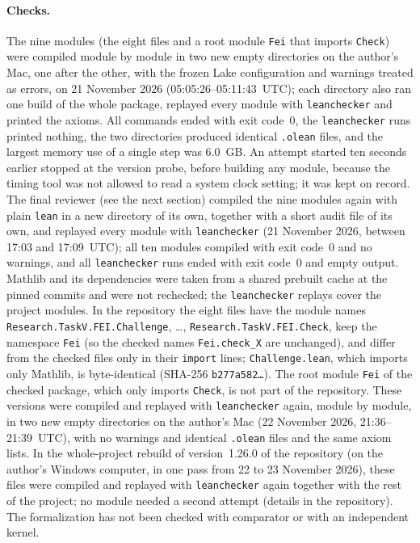 \documentclass[11pt]{article}
\theoremstyle{definition}
\theoremstyle{remark}
\newcommand{\repoversion}{1.26.0}
\begin{document}
{\paragraph{Checks.} The nine modules (the eight files and a root module
\texttt{Fei} that imports \texttt{Check}) were compiled module by module in two
new empty directories on the author's Mac, one after the other, with the frozen
Lake configuration and warnings treated as errors, on 21 November 2026
(05:05:26--05:11:43~UTC); each directory also ran one build of the whole
package, replayed every module with \texttt{leanchecker} and printed the axioms.
All commands ended with exit code~$0$, the \texttt{leanchecker} runs printed
nothing, the two directories produced identical \texttt{.olean} files, and the
largest memory use of a single step was $6.0$~GB. An attempt started ten seconds
earlier stopped at the version probe, before building any module, because the
timing tool was not allowed to read a system clock setting; it was kept on
record. The final reviewer (see the next section) compiled the nine modules
again with plain \texttt{lean} in a new directory of its own, together with a
short audit file of its own, and replayed every module with
\texttt{leanchecker} (21 November 2026, between 17:03 and 17:09~UTC); all ten
modules compiled with exit code~$0$ and no warnings, and all
\texttt{leanchecker} runs ended with exit code~$0$ and empty output. Mathlib and
its dependencies were taken from a shared prebuilt cache at the pinned commits
and were not rechecked; the \texttt{leanchecker} replays cover the project
modules. In the repository the eight files have the module names
\texttt{Research.TaskV.FEI.Challenge}, \dots,
\texttt{Research.TaskV.FEI.Check}, keep the namespace \texttt{Fei} (so the
checked names \texttt{Fei.check\_X} are unchanged), and differ from the checked
files only in their \texttt{import} lines; \texttt{Challenge.lean}, which
imports only Mathlib, is byte-identical (SHA-256 \texttt{b277a582\ldots}). The
root module \texttt{Fei} of the checked package, which only imports
\texttt{Check}, is not part of the repository.
These versions were compiled and replayed with \texttt{leanchecker} again, module by module, in two new empty directories on the author's Mac (22 November 2026, 21:36--21:39~UTC), with no warnings and identical \texttt{.olean} files and the same axiom lists.
In the whole-project rebuild of version~\repoversion{} of the repository (on the author's Windows computer, in one pass from 22 to 23 November 2026), these files were compiled and replayed with \texttt{leanchecker} again together with the rest of the project; no module needed a second attempt (details in the repository). The formalization has not been checked with comparator or with an
independent kernel.

\par}
\end{document}
